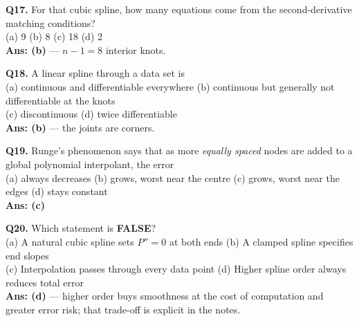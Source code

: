 \begin{mcqbox}
\textbf{Q17.} For that cubic spline, how many equations come from the second-derivative matching conditions?\\
(a) 9 \quad (b) 8 \quad (c) 18 \quad (d) 2\\
\textbf{Ans: (b)} --- $n-1 = 8$ interior knots.

\textbf{Q18.} A linear spline through a data set is\\
(a) continuous and differentiable everywhere \quad (b) continuous but generally not differentiable at the knots\\
(c) discontinuous \quad (d) twice differentiable\\
\textbf{Ans: (b)} --- the joints are corners.

\textbf{Q19.} Runge's phenomenon says that as more \emph{equally spaced} nodes are added to a global polynomial interpolant, the error\\
(a) always decreases \quad (b) grows, worst near the centre \quad (c) grows, worst near the edges \quad (d) stays constant\\
\textbf{Ans: (c)}

\textbf{Q20.} Which statement is \textbf{FALSE}?\\
(a) A natural cubic spline sets $P''=0$ at both ends \quad (b) A clamped spline specifies end slopes\\
(c) Interpolation passes through every data point \quad (d) Higher spline order always reduces total error\\
\textbf{Ans: (d)} --- higher order buys smoothness at the cost of computation and greater error risk; that trade-off is explicit in the notes.
\end{mcqbox}

